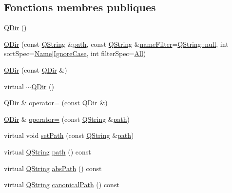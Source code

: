 \subsection*{Fonctions membres publiques}
\begin{DoxyCompactItemize}
\item 
\hyperlink{class_q_dir_a78cf34af6b7e0ffa3d11ef0ba0ecd403}{Q\+Dir} ()
\item 
\hyperlink{class_q_dir_ad4f09eb0858b034f2b2edff184e1f50d}{Q\+Dir} (const \hyperlink{class_q_string}{Q\+String} \&\hyperlink{class_q_dir_adc89b85ad2479f2b3baf899bfbe48f7f}{path}, const \hyperlink{class_q_string}{Q\+String} \&\hyperlink{class_q_dir_a8d501954ccb9e48d8e675c85c60ec57a}{name\+Filter}=\hyperlink{class_q_string_ad5c6b3d92cd7034d555365fd39bfdf4b}{Q\+String\+::null}, int sort\+Spec=\hyperlink{class_q_dir_a428a858abe9593efc498b6641b41994caa826dc828303a0b91b0f7215ab8ebea2}{Name}$\vert$\hyperlink{class_q_dir_a428a858abe9593efc498b6641b41994ca66b6c27f615e5c92ba48da265007db5d}{Ignore\+Case}, int filter\+Spec=\hyperlink{class_q_dir_a8b8c5b4f0028081f094c85129b8cc8b1a6a41a0538f66bdc9d57e12c15da80352}{All})
\item 
\hyperlink{class_q_dir_a16e6aedc84e9e1a5c10ded811b6510b3}{Q\+Dir} (const \hyperlink{class_q_dir}{Q\+Dir} \&)
\item 
virtual \hyperlink{class_q_dir_a1f28124d07dac6de42de73f074e7dbec}{$\sim$\+Q\+Dir} ()
\item 
\hyperlink{class_q_dir}{Q\+Dir} \& \hyperlink{class_q_dir_a3be7ccbacac7fa0e2fd2143259d0e04b}{operator=} (const \hyperlink{class_q_dir}{Q\+Dir} \&)
\item 
\hyperlink{class_q_dir}{Q\+Dir} \& \hyperlink{class_q_dir_a157b465ee1cb0ab76947e6f9d07f8715}{operator=} (const \hyperlink{class_q_string}{Q\+String} \&\hyperlink{class_q_dir_adc89b85ad2479f2b3baf899bfbe48f7f}{path})
\item 
virtual void \hyperlink{class_q_dir_ac947989c99aecbfebd509088b8834715}{set\+Path} (const \hyperlink{class_q_string}{Q\+String} \&\hyperlink{class_q_dir_adc89b85ad2479f2b3baf899bfbe48f7f}{path})
\item 
virtual \hyperlink{class_q_string}{Q\+String} \hyperlink{class_q_dir_adc89b85ad2479f2b3baf899bfbe48f7f}{path} () const 
\item 
virtual \hyperlink{class_q_string}{Q\+String} \hyperlink{class_q_dir_a884038b1ff47d15d4d763326698f0481}{abs\+Path} () const 
\item 
virtual \hyperlink{class_q_string}{Q\+String} \hyperlink{class_q_dir_a134133cb23364ce504a13a1e748232bc}{canonical\+Path} () const 

\end{DoxyCompactItemize}
